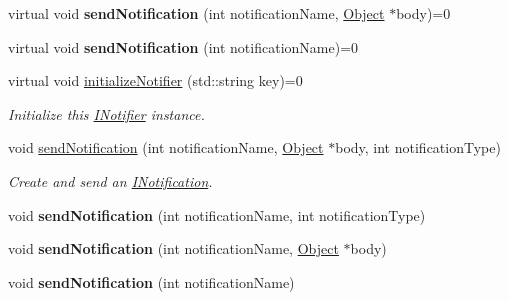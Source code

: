 \begin{DoxyCompactItemize}
\item 
\hypertarget{class_pure_m_v_c_1_1_i_notifier_a4d6bac0719be96948e4f7417489daeaa}{
virtual void {\bfseries sendNotification} (int notificationName, \hyperlink{class_pure_m_v_c_1_1_object}{Object} $\ast$body)=0}
\label{class_pure_m_v_c_1_1_i_notifier_a4d6bac0719be96948e4f7417489daeaa}

\item 
\hypertarget{class_pure_m_v_c_1_1_i_notifier_aca921608a2ced017a8face049fc7c6af}{
virtual void {\bfseries sendNotification} (int notificationName)=0}
\label{class_pure_m_v_c_1_1_i_notifier_aca921608a2ced017a8face049fc7c6af}

\item 
virtual void \hyperlink{class_pure_m_v_c_1_1_i_notifier_a28d7dbbe0726d4d52080546c5d79b232}{initializeNotifier} (std::string key)=0
\begin{DoxyCompactList}\small\item\em Initialize this \hyperlink{class_pure_m_v_c_1_1_i_notifier}{INotifier} instance. \item\end{DoxyCompactList}\item 
void \hyperlink{class_pure_m_v_c_1_1_notifier_a55a358ee2661ecc08400653016fdb497}{sendNotification} (int notificationName, \hyperlink{class_pure_m_v_c_1_1_object}{Object} $\ast$body, int notificationType)
\begin{DoxyCompactList}\small\item\em Create and send an {\ttfamily \hyperlink{class_pure_m_v_c_1_1_i_notification}{INotification}}. \item\end{DoxyCompactList}\item 
\hypertarget{class_pure_m_v_c_1_1_notifier_a6fa2ef42750287b410dcdd867479450b}{
void {\bfseries sendNotification} (int notificationName, int notificationType)}
\label{class_pure_m_v_c_1_1_notifier_a6fa2ef42750287b410dcdd867479450b}

\item 
\hypertarget{class_pure_m_v_c_1_1_notifier_a79a17268f222d42c1cc1f41a13da3b62}{
void {\bfseries sendNotification} (int notificationName, \hyperlink{class_pure_m_v_c_1_1_object}{Object} $\ast$body)}
\label{class_pure_m_v_c_1_1_notifier_a79a17268f222d42c1cc1f41a13da3b62}

\item 
\hypertarget{class_pure_m_v_c_1_1_notifier_a012642026e913c8e30d006e2e8f869c6}{
void {\bfseries sendNotification} (int notificationName)}
\label{class_pure_m_v_c_1_1_notifier_a012642026e913c8e30d006e2e8f869c6}


\end{DoxyCompactItemize}
